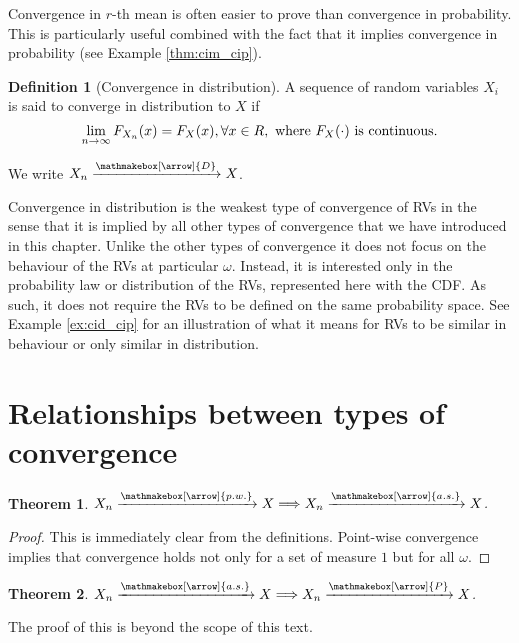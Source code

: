 \documentclass{book}
\theoremstyle{plain}%
\newtheorem{theorem}{Theorem}[section]
\theoremstyle{definition}
\newtheorem{definition}{Definition}[section]
\newlength{\arrow}
\newcommand*{\myrightarrow}[1]{\xrightarrow{\mathmakebox[\arrow]{#1}}}
\begin{document}
Convergence in $r$-th mean is often easier to prove than convergence in probability. This is particularly useful combined with the fact that it implies convergence in probability (see Example \ref{thm:cim_cip}).

\begin{definition}[Convergence in distribution]
A sequence of random variables ${X_i}$ is said to converge in distribution to $X$ if $$\lim_{n \rightarrow \infty} F_{X_n}(x) = F_X(x), \forall x \in R, \text{ where \mbox{$F_X(\cdot)$} is continuous.}$$

We write $X_n \myrightarrow{D} X$.
\end{definition}

Convergence in distribution is the weakest type of convergence of RVs in the sense that it is implied by all other types of convergence that we have introduced in this chapter. Unlike the other types of convergence it does not focus on the behaviour of the RVs at particular $\omega$. Instead, it is interested only in the probability law or distribution of the RVs, represented here with the CDF. As such, it does not require the RVs to be defined on the same probability space. See Example \ref{ex:cid_cip} for an illustration of what it means for RVs to be similar in behaviour or only similar in distribution.

\section{Relationships between types of convergence}\label{sec:rel}
\begin{theorem}
$X_n \myrightarrow{p.w.} X \Longrightarrow X_n \myrightarrow{a.s.} X$.
\end{theorem}

\begin{proof}
This is immediately clear from the definitions. Point-wise convergence implies that convergence holds not only for a set of measure $1$ but for all $\omega$.
\end{proof}


\begin{theorem}
$X_n \myrightarrow{a.s.} X \Longrightarrow X_n \myrightarrow{P} X$.
\end{theorem}

The proof of this is beyond the scope of this text.
\end{document}
